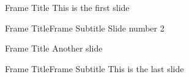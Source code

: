 \documentclass{beamer}
\begin{document}
\begin{frame}[t]{Frame Title}
This is the first slide
\end{frame}

\begin{frame}[t]{Frame Title}{Frame Subtitle}
Slide number 2
\end{frame}

\begin{frame}[t]{Frame Title}
Another slide
\end{frame}

\begin{frame}[t]{Frame Title}{Frame Subtitle}
This is the last slide
\end{frame}
\end{document}
